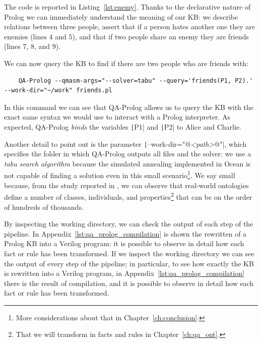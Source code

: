 {The code is reported in Listing~\ref{lst:enemy}. Thanks to the declarative nature of Prolog we can immediately understand the meaning of our KB: we describe relations between three people, assert that if a person hates another one they are enemies (lines $4$ and $5$), and that if two people share an enemy they are friends (lines $7$, $8$, and $9$). 

We can now query the KB to find if there are two people who are friends with:
\begin{verbatim}
	QA-Prolog --qmasm-args="--solver=tabu" --query='friends(P1, P2).' --work-dir="~/work" friends.pl
\end{verbatim}

In this command we can see that QA-Prolog allows us to query the KB with the exact same syntax we would use to interact with a Prolog interpreter. As expected, QA-Prolog \emph{binds} the variables \texttt|P1| and \texttt|P2| to Alice and Charlie.

Another detail to point out is the parameter \texttt|--work-dir="@\textit{<path>}@"|, which specifies the folder in which QA-Prolog outputs all files and the solver: we use a \emph{tabu search algorithm} because the simulated annealing implemented in Ocean is not capable of finding a solution even in this small scenario\footnote{More considerations about that in Chapter~\ref{ch:conclusion}.}. We say small because, from the study reported in \cite{zhang2010measuring}, we can observe that real-world ontologies define a number of classes, individuals, and properties\footnote{That we will transform in facts and rules in Chapter~\ref{ch:qa_ont}.} that can be on the order of hundreds of thousands.

By inspecting the working directory, we can check the output of each step of the pipeline. In Appendix~\ref{lst:qa_prolog_compilation} is shown the rewritten of a Prolog KB into a Verilog program: it is possible to observe in detail how each fact or rule has been transformed.
If we inspect the working directory we can see the output of every step of the pipeline; in particular, to see how exactly the KB is rewritten into a Verilog program, in Appendix~\ref{lst:qa_prolog_compilation} there is the result of compilation, and it is possible to observe in detail how each fact or rule has been transformed.

}

